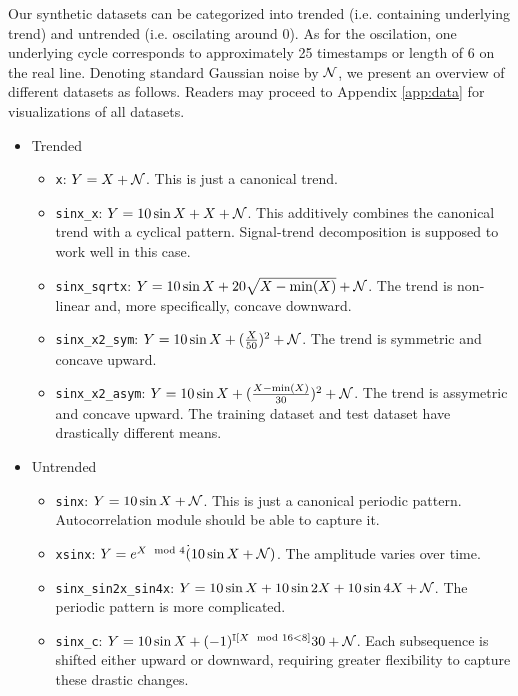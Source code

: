 Our synthetic datasets can be categorized into trended (i.e. containing underlying trend) and untrended (i.e. oscilating around 0). 
As for the oscilation, one underlying cycle corresponds to approximately 25 timestamps or length of 6 on the real line. 
Denoting standard Gaussian noise by $\mathcal{N}$, we present an overview of different datasets as follows. 
Readers may proceed to Appendix \ref{app:data} for visualizations of all datasets. \begin{itemize}
    \item Trended \begin{itemize}
        \item \texttt{x}: $Y = X + \mathcal{N}$. This is just a canonical trend. 
        \item \texttt{sinx\_x}: $Y = 10\sin X + X + \mathcal{N}$. This additively combines the canonical trend with a cyclical pattern. Signal-trend decomposition is supposed to work well in this case. 
        \item \texttt{sinx\_sqrtx}: $Y = 10\sin X + 20\sqrt{X - \min(X)} + \mathcal{N}$. The trend is non-linear and, more specifically, concave downward. 
        \item \texttt{sinx\_x2\_sym}: $Y = 10\sin X + (\frac{X}{50})^2 + \mathcal{N}$. The trend is symmetric and concave upward. 
        \item \texttt{sinx\_x2\_asym}: $Y = 10\sin X + (\frac{X - \min(X)}{30})^2 + \mathcal{N}$. The trend is assymetric and concave upward. The training dataset and test dataset have drastically different means. 
    \end{itemize}
    \item Untrended \begin{itemize}
        \item \texttt{sinx}: $Y = 10\sin X + \mathcal{N}$. This is just a canonical periodic pattern. Autocorrelation module should be able to capture it. 
        \item \texttt{xsinx}: $Y = e^{X \mod 4} \dot (10\sin X + \mathcal{N})$. The amplitude varies over time. 
        \item \texttt{sinx\_sin2x\_sin4x}: $Y = 10\sin X + 10\sin 2X + 10\sin 4X + \mathcal{N}$. The periodic pattern is more complicated. 
        \item \texttt{sinx\_c}: $Y = 10\sin X + (-1)^{\mathbb{I}[X \mod 16 < 8]} 30 + \mathcal{N}$. Each subsequence is shifted either upward or downward, requiring greater flexibility to capture these drastic changes. 
    \end{itemize}
\end{itemize}

